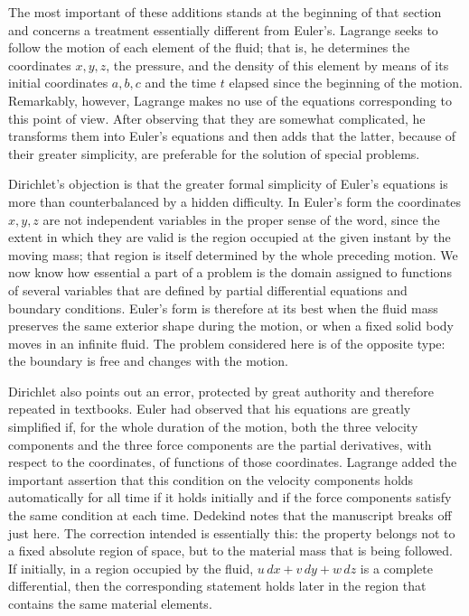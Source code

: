 \documentclass[11pt]{article}
\newcommand{\dd}{\,d}
\begin{document}
The most important of these additions stands at the beginning of that section and concerns a treatment essentially different from Euler's.  Lagrange seeks to follow the motion of each element of the fluid; that is, he determines the coordinates \(x,y,z\), the pressure, and the density of this element by means of its initial coordinates \(a,b,c\) and the time \(t\) elapsed since the beginning of the motion.  Remarkably, however, Lagrange makes no use of the equations corresponding to this point of view.  After observing that they are somewhat complicated, he transforms them into Euler's equations and then adds that the latter, because of their greater simplicity, are preferable for the solution of special problems.

Dirichlet's objection is that the greater formal simplicity of Euler's equations is more than counterbalanced by a hidden difficulty.  In Euler's form the coordinates \(x,y,z\) are not independent variables in the proper sense of the word, since the extent in which they are valid is the region occupied at the given instant by the moving mass; that region is itself determined by the whole preceding motion.  We now know how essential a part of a problem is the domain assigned to functions of several variables that are defined by partial differential equations and boundary conditions.  Euler's form is therefore at its best when the fluid mass preserves the same exterior shape during the motion, or when a fixed solid body moves in an infinite fluid.  The problem considered here is of the opposite type: the boundary is free and changes with the motion.

Dirichlet also points out an error, protected by great authority and therefore repeated in textbooks.  Euler had observed that his equations are greatly simplified if, for the whole duration of the motion, both the three velocity components and the three force components are the partial derivatives, with respect to the coordinates, of functions of those coordinates.  Lagrange added the important assertion that this condition on the velocity components holds automatically for all time if it holds initially and if the force components satisfy the same condition at each time.  Dedekind notes that the manuscript breaks off just here.  The correction intended is essentially this: the property belongs not to a fixed absolute region of space, but to the material mass that is being followed.  If initially, in a region occupied by the fluid, \(u\dd x+v\dd y+w\dd z\) is a complete differential, then the corresponding statement holds later in the region that contains the same material elements.
\end{document}
